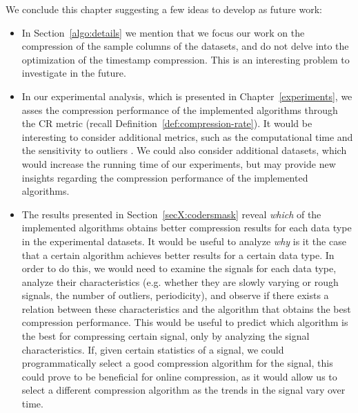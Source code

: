 We conclude this chapter suggesting a few ideas to develop as future work:

\vspace{-5pt}

\begin{itemize}

\item In Section~\ref{algo:details} we mention that we focus our work on the compression of the sample columns of the datasets, and do not delve into the optimization of the timestamp compression. This is an interesting problem to investigate in the future.

\item In our experimental analysis, which is presented in Chapter~\ref{experiments}, we asses the compression performance of the implemented algorithms through the CR metric (recall Definition~\ref{def:compression-rate}). It would be interesting to consider additional metrics, such as the computational time and the sensitivity to outliers \cite{AnEva2013}. We could also consider additional datasets, which would increase the running time of our experiments, but may provide new insights regarding the compression performance of the implemented algorithms.

\item The results presented in Section~\ref{secX:codersmask} reveal \textit{which} of the implemented algorithms obtains better compression results for each data type in the experimental datasets. It would be useful to analyze \textit{why} is it the case that a certain algorithm achieves better results for a certain data type. In order to do this, we would need to examine the signals for each data type, analyze their characteristics (e.g. whether they are slowly varying or rough signals, the number of outliers, periodicity), and observe if there exists a relation between these characteristics and the algorithm that obtains the best compression performance. This would be useful to predict which algorithm is the best for compressing certain signal, only by analyzing the signal characteristics. If, given certain statistics of a signal, we could programmatically select a good compression algorithm for the signal, this could prove to be beneficial for online compression, as it would allow us to select a different compression algorithm as the trends in the signal vary over time.

\end{itemize}

